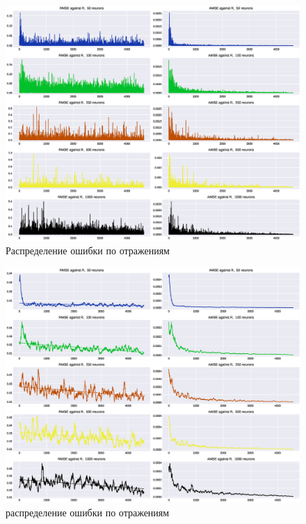 \documentclass{article}
\begin{document}
\begin{figure}[!htp]
\centering
\includegraphics[width=\linewidth]{imgs/aenc-errdist.eps}
\caption{Распределение ошибки по отражениям}
\label{fig:aenc_errdist}
\end{figure}


\begin{figure}[!htp]
\centering
\includegraphics[scale=0.50]{imgs/aenc-errdist_fl.eps}
\caption{распределение ошибки по отражениям}
\label{fig:aenc_errdist_fl}
\end{figure}



\end{document}
